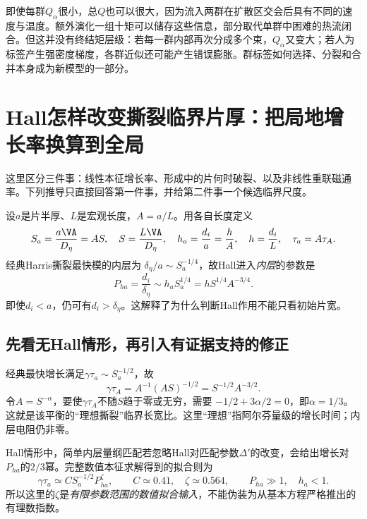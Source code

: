 即使每群$Q_\alpha$很小，总$Q$也可以很大，因为流入两群在扩散区交会后具有不同的速度与温度。额外演化一组十矩可以储存这些信息，部分取代单群中困难的热流闭合。但这并没有终结矩层级：若每一群内部再次分成多个束，$Q_\alpha$又变大；若人为标签产生强密度梯度，各群近似还可能产生错误膨胀。群标签如何选择、分裂和合并本身成为新模型的一部分。

\section{Hall怎样改变撕裂临界片厚：把局地增长率换算到全局}
这里区分三件事：线性本征增长率、形成中的片何时破裂、以及非线性重联磁通率。下列推导只直接回答第一件事，并给第二件事一个候选临界尺度。\citep{L236,L262}

设$a$是片半厚、$L$是宏观长度，$A=a/L$。用各自长度定义
\begin{equation}
 S_a=\frac{a\VA}{D_\eta}=AS,\quad
 S=\frac{L\VA}{D_\eta},\quad h_a=\frac{d_i}{a}=\frac{h}{A},\quad
 h=\frac{d_i}{L},\quad \tau_a=A\tau_A.
\end{equation}
经典Harris撕裂最快模的内层为
$\delta_\eta/a\sim S_a^{-1/4}$，故Hall进入\emph{内层}的参数是
\begin{equation}
 P_{ha}=\frac{d_i}{\delta_\eta}\sim h_a S_a^{1/4}
        =hS^{1/4}A^{-3/4}.
\end{equation}
即使$d_i<a$，仍可有$d_i>\delta_\eta$。这解释了为什么判断Hall作用不能只看初始片宽。

\subsection{先看无Hall情形，再引入有证据支持的修正}
经典最快增长满足$\gamma\tau_a\sim S_a^{-1/2}$，故
\begin{equation}
 \gamma\tau_A=A^{-1}(AS)^{-1/2}=S^{-1/2}A^{-3/2}.
\end{equation}
令$A=S^{-\alpha}$，要使$\gamma\tau_A$不随$S$趋于零或无穷，需要
$-1/2+3\alpha/2=0$，即$\alpha=1/3$。这就是该平衡的“理想撕裂”临界长宽比。这里“理想”指阿尔芬量级的增长时间；内层电阻仍非零。

Hall情形中，简单内层量纲匹配若忽略Hall对匹配参数$\Delta'$的改变，会给出增长对$P_{ha}$的$2/3$幂。完整数值本征求解得到的拟合则为
\begin{equation}
 \gamma\tau_a\simeq C S_a^{-1/2}P_{ha}^{\zeta},
 \qquad C\simeq0.41,\quad\zeta\simeq0.564,
 \qquad P_{ha}\gg1,\quad h_a<1.
\end{equation}
所以这里的$\zeta$是\emph{有限参数范围的数值拟合输入}，不能伪装为从基本方程严格推出的有理数指数。

